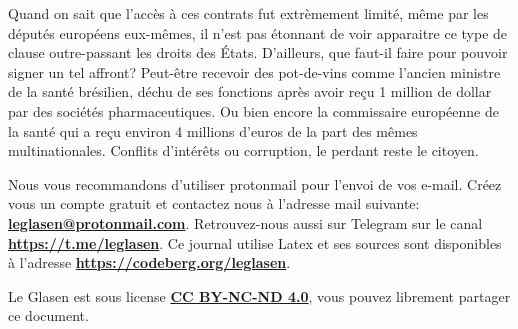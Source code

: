 \documentclass[a4paper]{article}
\begin{document}
\begin{multicols}{3}
Quand on sait que l'accès à ces contrats fut extrèmement limité, même
par les députés européens eux-mêmes, il n'est pas étonnant de voir
apparaitre ce type de clause outre-passant les droits des
États. D'ailleurs, que faut-il faire pour pouvoir signer un tel
affront? Peut-être recevoir des pot-de-vins comme l'ancien ministre de
la santé brésilien, déchu de ses fonctions après avoir reçu 1 million
de dollar\cite{Bresil:Corruption:MinistreSante} par des sociétés
pharmaceutiques. Ou bien encore la commissaire européenne de la santé
qui a reçu environ 4 millions d'euros de la part des mêmes
multinationales\cite{Europe:Corruption:CommissionVaccin}. Conflits
d'intérêts ou corruption, le perdant reste le citoyen.
\closearticle

Nous vous recommandons d'utiliser protonmail pour l'envoi de vos
e-mail. Créez vous un compte gratuit et contactez nous à l'adresse
mail suivante: \textbf{\url{leglasen@protonmail.com}}. Retrouvez-nous
aussi sur Telegram sur le canal
\textbf{\url{https://t.me/leglasen}}. Ce journal utilise Latex et ses
sources sont disponibles à l'adresse
\textbf{\url{https://codeberg.org/leglasen}}. 

Le Glasen est sous license \textbf{\url{CC BY-NC-ND 4.0}}, vous pouvez
librement partager ce document.

\closearticle

\printbibliography[heading=none]

\end{multicols}
\end{document}

